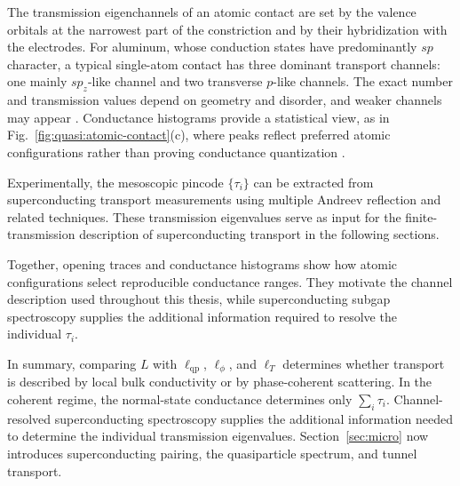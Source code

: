             The transmission eigenchannels of an atomic contact are set by the valence orbitals at the narrowest part of the constriction and by their hybridization with the electrodes. For aluminum, whose conduction states have predominantly $sp$ character, a typical single-atom contact has three dominant transport channels: one mainly $sp_z$-like channel and two transverse $p$-like channels. The exact number and transmission values depend on geometry and disorder, and weaker channels may appear \cite{scheer_conduction_1997,scheer_signature_1998}. Conductance histograms provide a statistical view, as in Fig.~\ref{fig:quasi:atomic-contact}(c), where peaks reflect preferred atomic configurations rather than proving conductance quantization \cite{yanson_histograms_1997,agrait_quantum_2003}.

            Experimentally, the mesoscopic pincode $\{\tau_i\}$ can be extracted from superconducting transport measurements using multiple Andreev reflection and related techniques. These transmission eigenvalues serve as input for the finite-transmission description of superconducting transport in the following sections. \cite{scheer_conduction_1997,scheer_signature_1998}

            Together, opening traces and conductance histograms show how atomic configurations select reproducible conductance ranges. They motivate the channel description used throughout this thesis, while superconducting subgap spectroscopy supplies the additional information required to resolve the individual $\tau_i$.

    In summary, comparing $L$ with $\ell_\mathrm{qp}$, $\ell_\phi$, and $\ell_T$ determines whether transport is described by local bulk conductivity or by phase-coherent scattering. In the coherent regime, the normal-state conductance determines only $\sum_i\tau_i$. Channel-resolved superconducting spectroscopy supplies the additional information needed to determine the individual transmission eigenvalues. Section~\ref{sec:micro} now introduces superconducting pairing, the quasiparticle spectrum, and tunnel transport.
